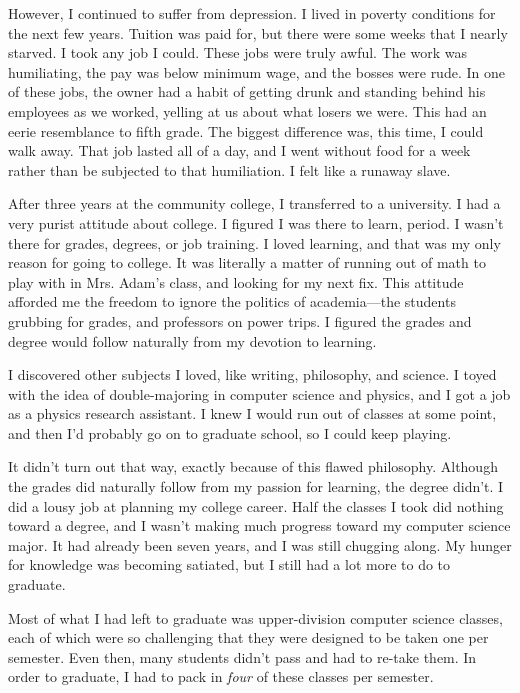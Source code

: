 However, I continued to suffer from depression. I lived in poverty conditions for the next few years. Tuition was paid for, but there were some weeks that I nearly starved. I took any job I could. These jobs were truly awful. The work was humiliating, the pay was below minimum wage, and the bosses were rude. In one of these jobs, the owner had a habit of getting drunk and standing behind his employees as we worked, yelling at us about what losers we were. This had an eerie resemblance to fifth grade. The biggest difference was, this time, I could walk away. That job lasted all of a day, and I went without food for a week rather than be subjected to that humiliation. I felt like a runaway slave.

After three years at the community college, I transferred to a university. I had a very purist attitude about college. I figured I was there to learn, period. I wasn't there for grades, degrees, or job training. I loved learning, and that was my only reason for going to college. It was literally a matter of running out of math to play with in Mrs. Adam's class, and looking for my next fix. This attitude afforded me the freedom to ignore the politics of academia---the students grubbing for grades, and professors on power trips. I figured the grades and degree would follow naturally from my devotion to learning.

I discovered other subjects I loved, like writing, philosophy, and science. I toyed with the idea of double-majoring in computer science and physics, and I got a job as a physics research assistant. I knew I would run out of classes at some point, and then I'd probably go on to graduate school, so I could keep playing.

It didn't turn out that way, exactly because of this flawed philosophy. Although the grades did naturally follow from my passion for learning, the degree didn't. I did a lousy job at planning my college career. Half the classes I took did nothing toward a degree, and I wasn't making much progress toward my computer science major. It had already been seven years, and I was still chugging along. My hunger for knowledge was becoming satiated, but I still had a lot more to do to graduate.

Most of what I had left to graduate was upper-division computer science classes, each of which were so challenging that they were designed to be taken one per semester. Even then, many students didn't pass and had to re-take them. In order to graduate, I had to pack in \emph{four} of these classes per semester. 

